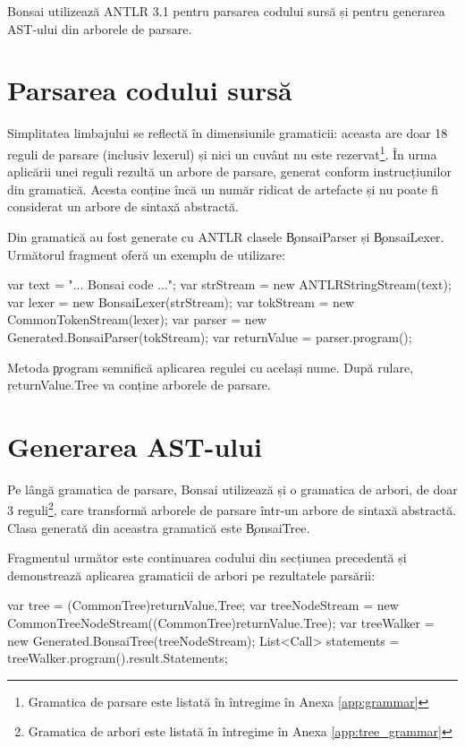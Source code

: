 \documentclass[12pt,a4paper]{memoir}
\begin{document}
Bonsai utilizează ANTLR 3.1 pentru parsarea codului sursă și pentru generarea AST-ului din arborele de parsare.

\section{Parsarea codului sursă}

Simplitatea limbajului se reflectă în dimensiunile gramaticii: aceasta are doar 18 reguli de parsare (inclusiv lexerul) și nici un cuvânt nu este rezervat\footnote{Gramatica de parsare este listată în întregime în Anexa \ref{app:grammar}}. În urma aplicării unei reguli rezultă un arbore de parsare, generat conform instrucțiunilor din gramatică. Acesta conține încă un număr ridicat de artefacte și nu poate fi considerat un arbore de sintaxă abstractă.

Din gramatică au fost generate cu ANTLR clasele \c{BonsaiParser} și \c{BonsaiLexer}. Următorul fragment oferă un exemplu de utilizare:

\begin{code}
var text = "... Bonsai code ...";
var strStream = new ANTLRStringStream(text);
var lexer = new BonsaiLexer(strStream);
var tokStream = new CommonTokenStream(lexer);
var parser = new Generated.BonsaiParser(tokStream);
var returnValue = parser.program();
\end{code}

Metoda \c{program} semnifică aplicarea regulei cu același nume. După rulare, \c{returnValue.Tree} va conține arborele de parsare.

\section{Generarea AST-ului}

Pe lângă gramatica de parsare, Bonsai utilizează și o gramatica de arbori, de doar 3 reguli\footnote{Gramatica de arbori este listată în întregime în Anexa \ref{app:tree_grammar}}, care transformă arborele de parsare într-un arbore de sintaxă abstractă. Clasa generată din aceastra gramatică este \c{BonsaiTree}.

Fragmentul următor este continuarea codului din secțiunea precedentă și demonstrează aplicarea gramaticii de arbori pe rezultatele parsării:

\begin{code}
var tree = (CommonTree)returnValue.Tree;
var treeNodeStream = 
    new CommonTreeNodeStream((CommonTree)returnValue.Tree);
var treeWalker = new Generated.BonsaiTree(treeNodeStream);
List<Call> statements = treeWalker.program().result.Statements;
\end{code}
\end{document}
